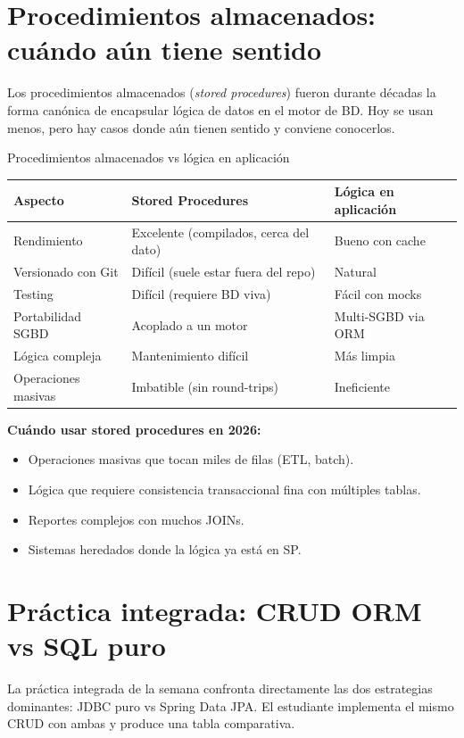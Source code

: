 \section{Procedimientos almacenados: cuándo aún tiene sentido}

Los procedimientos almacenados (\emph{stored procedures})
fueron durante décadas la forma canónica de encapsular lógica de
datos en el motor de BD. Hoy se usan menos, pero hay casos donde aún
tienen sentido y conviene conocerlos.


\begin{cajacompara}{Procedimientos almacenados vs lógica en aplicación}
\centering\footnotesize
\begin{tabularx}{\textwidth}{lXX}
\toprule
\textbf{Aspecto} & \textbf{Stored Procedures} & \textbf{Lógica en aplicación}\\
\midrule
Rendimiento & Excelente (compilados, cerca del dato) & Bueno con cache\\
Versionado con Git & Difícil (suele estar fuera del repo) & Natural\\
Testing & Difícil (requiere BD viva) & Fácil con mocks\\
Portabilidad SGBD & Acoplado a un motor & Multi-SGBD via ORM\\
Lógica compleja & Mantenimiento difícil & Más limpia\\
Operaciones masivas & Imbatible (sin round-trips) & Ineficiente\\
\bottomrule
\end{tabularx}
\end{cajacompara}

\textbf{Cuándo usar stored procedures en 2026:}
\begin{itemize}
\item Operaciones masivas que tocan miles de filas (ETL, batch).
\item Lógica que requiere consistencia transaccional fina con
múltiples tablas.
\item Reportes complejos con muchos JOINs.
\item Sistemas heredados donde la lógica ya está en SP.
\end{itemize}

\section{Práctica integrada: CRUD ORM vs SQL puro}

La práctica integrada de la semana confronta directamente
las dos estrategias dominantes: JDBC puro vs Spring Data JPA. El
estudiante implementa el mismo CRUD con ambas y produce una tabla
comparativa.



